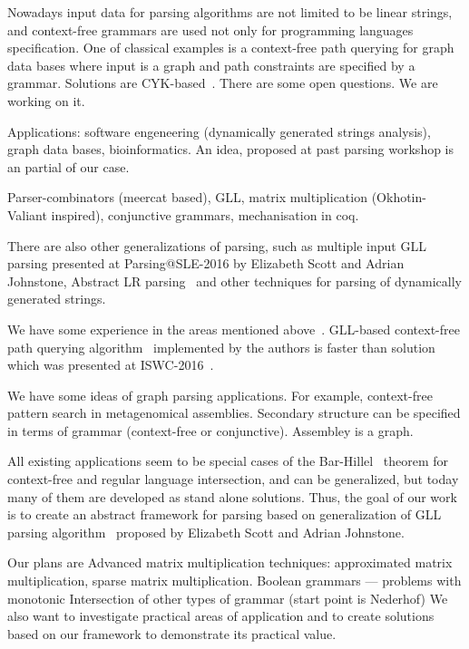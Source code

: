 \documentclass{vldb}
\begin{document}
Nowadays input data for parsing algorithms are not limited to be linear strings, and context-free grammars are used not only for programming languages specification.
One of classical examples is a context-free path querying for graph data bases where input is a graph and path constraints are specified by a grammar.
Solutions are CYK-based~\cite{...}.
There are some open questions.
We are working on it.

Applications: software engeneering (dynamically generated strings analysis), graph data bases, bioinformatics.
An idea, proposed at past parsing workshop is an partial of our case.

Parser-combinators (meercat based), GLL, matrix multiplication (Okhotin-Valiant inspired), conjunctive grammars, mechanisation in coq.

There are also other generalizations of parsing, such as multiple input GLL parsing presented at Parsing@SLE-2016 by Elizabeth Scott and Adrian Johnstone, 
Abstract LR parsing~\cite{AbstractParsing} and other techniques for parsing of dynamically generated strings.

We have some experience in the areas mentioned above~\cite{GraphGLL, RelaxedRNGLR}.
GLL-based context-free path querying algorithm~\cite{GraphGLL} implemented by the authors is faster than solution which was presented at ISWC-2016~\cite{CFRDFParsing}. 

We have some ideas of graph parsing applications.
For example, context-free pattern search in metagenomical assemblies. 
Secondary structure can be specified in terms of grammar (context-free or conjunctive).
Assembley is a graph.

All existing applications seem to be special cases of the Bar-Hillel~\cite{Bar-Hillel} theorem for context-free and regular language intersection, and can be generalized, but today many of them are developed as stand alone solutions.
Thus, the goal of our work is to create an abstract framework for parsing based on generalization of GLL parsing algorithm~\cite{GLL} proposed by Elizabeth Scott and Adrian Johnstone. 

Our plans are 
Advanced matrix multiplication techniques: approximated matrix multiplication, sparse matrix multiplication.
Boolean grammars --- problems with monotonic
Intersection of other types of grammar (start point is Nederhof)
We also want to investigate practical areas of application and to create solutions based on our framework to demonstrate its practical value.
\end{document}
